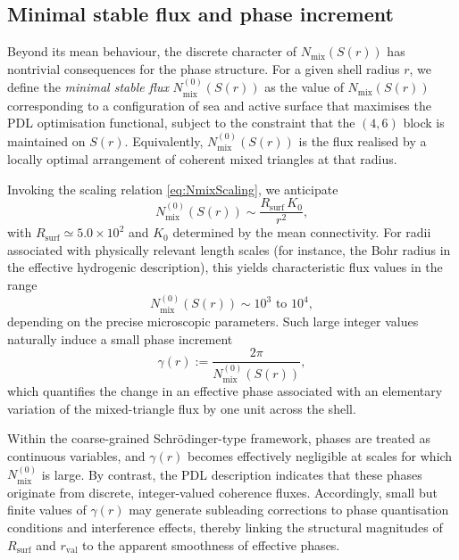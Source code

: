 \documentclass[11pt,a4paper]{article}
\begin{document}
\subsection{Minimal stable flux and phase increment}

Beyond its mean behaviour, the discrete character of $N_{\mathrm{mix}}(S(r))$ has nontrivial consequences for the phase structure.
For a given shell radius $r$, we define the \emph{minimal stable flux} $N_{\mathrm{mix}}^{(0)}(S(r))$ as the value of $N_{\mathrm{mix}}(S(r))$ corresponding to a configuration of sea and active surface that maximises the PDL optimisation functional, subject to the constraint that the $(4,6)$ block is maintained on $S(r)$.\cite{Laubscher2026SchrodingerSketch}
Equivalently, $N_{\mathrm{mix}}^{(0)}(S(r))$ is the flux realised by a locally optimal arrangement of coherent mixed triangles at that radius.

Invoking the scaling relation \eqref{eq:NmixScaling}, we anticipate
\[
N_{\mathrm{mix}}^{(0)}(S(r)) \sim \frac{R_{\mathrm{surf}}\,K_{0}}{r^{2}},
\]
with $R_{\mathrm{surf}}\simeq 5.0\times 10^{2}$ and $K_{0}$ determined by the mean connectivity.
For radii associated with physically relevant length scales (for instance, the Bohr radius in the effective hydrogenic description), this yields characteristic flux values in the range
\[
N_{\mathrm{mix}}^{(0)}(S(r)) \sim 10^{3} \text{ to } 10^{4},
\]
depending on the precise microscopic parameters.\cite{Laubscher2026SchrodingerSketch}
Such large integer values naturally induce a small phase increment
\begin{equation}
\gamma(r) := \frac{2\pi}{N_{\mathrm{mix}}^{(0)}(S(r))},
\label{eq:gammaDef}
\end{equation}
which quantifies the change in an effective phase associated with an elementary variation of the mixed-triangle flux by one unit across the shell.

Within the coarse-grained Schr\"odinger-type framework, phases are treated as continuous variables, and $\gamma(r)$ becomes effectively negligible at scales for which $N_{\mathrm{mix}}^{(0)}$ is large.
By contrast, the PDL description indicates that these phases originate from discrete, integer-valued coherence fluxes.
Accordingly, small but finite values of $\gamma(r)$ may generate subleading corrections to phase quantisation conditions and interference effects, thereby linking the structural magnitudes of $R_{\mathrm{surf}}$ and $r_{\mathrm{val}}$ to the apparent smoothness of effective phases.\cite{Laubscher2026Alpha,Laubscher2026SchrodingerSketch}
\end{document}
